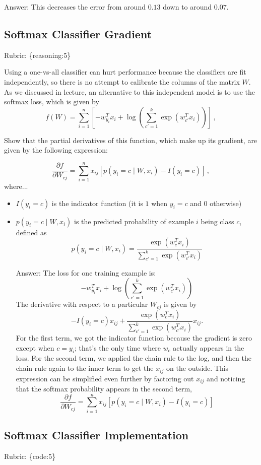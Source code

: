 \documentclass{article}
\def\ans#1{\par\gre{Answer: #1}}
\def\answer#1{\ans{#1}}
\def\rubric#1{\gre{Rubric: \{#1\}}}{}
\def\blu#1{{\color{blu}#1}}
\def\gre#1{{\color{gre}#1}}
\begin{document}
\answer{
This decreases the error from around $0.13$ down to around $0.07$.
}


\subsection{Softmax Classifier Gradient}
\rubric{reasoning:5}

Using a one-vs-all classifier can hurt performance because the classifiers are fit independently, so there is no attempt to calibrate the columns of the matrix $W$. As we discussed in lecture, an alternative to this independent model is to use the softmax loss, which is given by
\[
f(W) = \sum_{i=1}^n \left[-w_{y_i}^Tx_i + \log\left(\sum_{c' = 1}^k \exp(w_{c'}^Tx_i)\right)\right] \, ,
\]

\blu{Show that the partial derivatives of this function, which make up its gradient, are given by the following expression:}

\[
\frac{\partial f}{\partial W_{cj}} = \sum_{i=1}^n x_{ij}[p(y_i=c \mid W,x_i) - I(y_i = c)] \, ,
\]
where...
\begin{itemize}
\item $I(y_i = c)$ is the indicator function (it is $1$ when $y_i=c$ and $0$ otherwise)
\item $p(y_i=c \mid W, x_i)$ is the predicted probability of example $i$ being class $c$, defined as
\[
p(y_i=c \mid W, x_i) = \frac{\exp(w_c^Tx_i)}{\sum_{c'=1}^k\exp(w_{c'}^Tx_i)}
\]


\answer{
The loss for one training example is:
\[
-w_{y_i}^Tx_i + \log\left(\sum_{c' = 1}^k \exp(w_{c'}^Tx_i)\right)
\]
The derivative with respect to a particular $W_{cj}$ is given by
\[
-I(y_i = c)x_{ij} + \frac{\exp(w_c^Tx_i)}{\sum_{c'=1}^k\exp(w_{c'}^Tx_i)}x_{ij}.
\]
For the first term, we got the indicator function because the gradient is zero except when $c=y_i$; that's the only time where $w_c$ actually appears in the loss. For the second term, we applied the chain rule to the log, and then the chain rule again to the inner term to get the $x_{ij}$ on the outside.
This expression can be simplified even further by factoring out $x_{ij}$ and  noticing that the softmax probability appears in the second term,
\[
\frac{\partial f}{\partial W_{cj}} = \sum_{i=1}^n x_{ij}[p(y_i=c \mid W,x_i) - I(y_i = c)]
\]
}

\end{itemize}

\subsection{Softmax Classifier Implementation}
\rubric{code:5}
\end{document}
